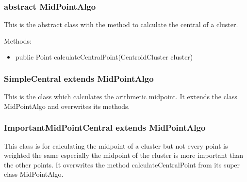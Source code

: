 	

	
	
	\subsubsection{abstract MidPointAlgo}
	
	This is the abstract class with the method to calculate the central of a cluster.

	\newline Methods:
	\begin{itemize}
		\item public Point calculateCentralPoint(CentroidCluster cluster) 
	\end{itemize}
	
	
	
	\subsubsection{SimpleCentral extends MidPointAlgo}
	
	This is the class which calculates the arithmetic midpoint. It extends the class MidPointAlgo and overwrites its methods.	
	
	
	
	
	
	
	\subsubsection{ImportantMidPointCentral extends MidPointAlgo}
	
	This class is for calculating the midpoint of a cluster but not every point is weighted the same especially the midpoint of the cluster is more important than the other points. It overwrites the method calculateCentralPoint from its super class MidPointAlgo. 	
	
	\newpage

